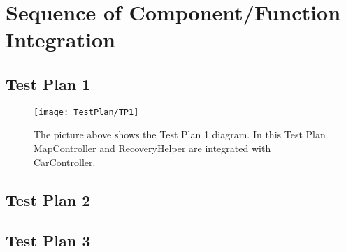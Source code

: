 
\section{Sequence of Component/Function Integration}
\blindtext

\subsection{Test Plan 1}
\blindtext
\begin{figure}[H]
	\centering
	\texttt{[image: TestPlan/TP1]}
	\caption[Test Plan 1 diagram]{The picture above shows the Test Plan 1 diagram. In this Test Plan MapController and RecoveryHelper are integrated with CarController.}
	\label{fig:TestPlan-1}
\end{figure}

\subsection{Test Plan 2}
\blindtext

\subsection{Test Plan 3}
\blindtext
